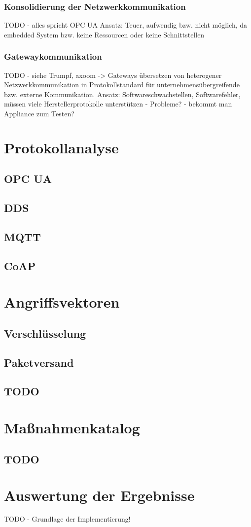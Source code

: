 \subsubsection{Konsolidierung der Netzwerkkommunikation}
TODO - alles spricht OPC UA
Ansatz: Teuer, aufwendig bzw. nicht möglich, da embedded System bzw. keine Ressourcen oder keine Schnittstellen

\subsubsection{Gatewaykommunikation}
TODO - siehe Trumpf, axoom -> Gateways übersetzen von heterogener Netzwerkkommunikation in Protokollstandard für unternehmensübergreifende bzw. externe Kommunikation.
Ansatz: Softwareschwachstellen, Softwarefehler, müssen viele Herstellerprotokolle unterstützen - Probleme? - bekommt man Appliance zum Testen?

\section{Protokollanalyse}
\subsection{OPC UA}
\subsection{DDS}
\subsection{MQTT}
\subsection{CoAP}

\section{Angriffsvektoren}
\subsection{Verschlüsselung}
\subsection{Paketversand}
\subsection{TODO}

\section{Maßnahmenkatalog}

\subsection{TODO}

\section{Auswertung der Ergebnisse}
TODO - Grundlage der Implementierung!